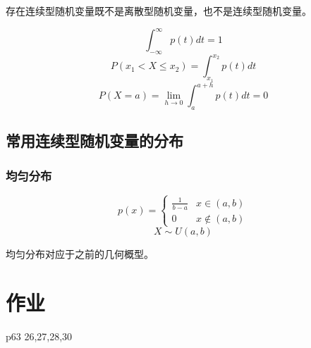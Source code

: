 \documentclass[10pt, a4paper]{article}
\begin{document}
        存在连续型随机变量既不是离散型随机变量，也不是连续型随机变量。

        $$\int_{-\infty}^{\infty}p(t)dt = 1$$
        $$P(x_1 < X \leqslant x_2) = \int_{x_1}^{x_2}p(t)dt$$
        $$P(X = a) = \lim_{h\rightarrow0}\int_{a}^{a + h}p(t)dt = 0$$
    \subsection{常用连续型随机变量的分布}
        \subsubsection{均匀分布}
        $$
        p(x) = 
        \begin{cases}
            \frac{1}{b - a} & x \in (a, b) \\
            0 & x\notin (a, b)
        \end{cases}
        $$
        $$X \sim U(a, b)$$

        均匀分布对应于之前的几何概型。


\section{作业}
p63 26,27,28,30
        
\end{document}
